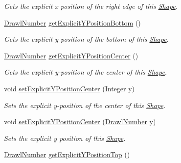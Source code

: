 \begin{DoxyCompactItemize}
\begin{DoxyCompactList}\small\item\em Gets the explicit x position of the right edge of this \hyperlink{classcom_1_1aarrelaakso_1_1drawl_1_1_shape}{Shape}. \end{DoxyCompactList}\item 
\hyperlink{classcom_1_1aarrelaakso_1_1drawl_1_1_drawl_number}{Drawl\+Number} \hyperlink{classcom_1_1aarrelaakso_1_1drawl_1_1_shape_aa26eb0263851ed8f8221bf3740e6e584}{get\+Explicit\+Y\+Position\+Bottom} ()
\begin{DoxyCompactList}\small\item\em Gets the explicit y position of the bottom of this \hyperlink{classcom_1_1aarrelaakso_1_1drawl_1_1_shape}{Shape}. \end{DoxyCompactList}\item 
\hyperlink{classcom_1_1aarrelaakso_1_1drawl_1_1_drawl_number}{Drawl\+Number} \hyperlink{classcom_1_1aarrelaakso_1_1drawl_1_1_shape_a602cb73f783f2856fa81e82bf7792263}{get\+Explicit\+Y\+Position\+Center} ()
\begin{DoxyCompactList}\small\item\em Gets the explicit y-\/position of the center of this \hyperlink{classcom_1_1aarrelaakso_1_1drawl_1_1_shape}{Shape}. \end{DoxyCompactList}\item 
void \hyperlink{classcom_1_1aarrelaakso_1_1drawl_1_1_shape_a947c00be2ea3d0e732814b8ca377df45}{set\+Explicit\+Y\+Position\+Center} (Integer y)
\begin{DoxyCompactList}\small\item\em Sets the explicit y-\/position of the center of this \hyperlink{classcom_1_1aarrelaakso_1_1drawl_1_1_shape}{Shape}. \end{DoxyCompactList}\item 
void \hyperlink{classcom_1_1aarrelaakso_1_1drawl_1_1_shape_a169bdd3220baa80ebb083b3b2db12546}{set\+Explicit\+Y\+Position\+Center} (\hyperlink{classcom_1_1aarrelaakso_1_1drawl_1_1_drawl_number}{Drawl\+Number} y)
\begin{DoxyCompactList}\small\item\em Sets the explicit y position of this \hyperlink{classcom_1_1aarrelaakso_1_1drawl_1_1_shape}{Shape}. \end{DoxyCompactList}\item 
\hyperlink{classcom_1_1aarrelaakso_1_1drawl_1_1_drawl_number}{Drawl\+Number} \hyperlink{classcom_1_1aarrelaakso_1_1drawl_1_1_shape_a95f8a2f107299d91813627a95b3e0f0f}{get\+Explicit\+Y\+Position\+Top} ()

\end{DoxyCompactItemize}
